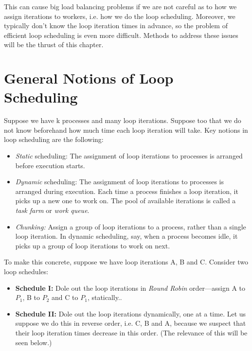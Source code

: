 This can cause big load balancing problems if we are not careful as to
how we assign iterations to workers, i.e. how we do the loop scheduling.
Moreover, we typically don't know the loop iteration times in advance, so the
problem of efficient loop scheduling is even more difficult.  Methods to
address these issues will be the thrust of this chapter.

\section{General Notions of Loop Scheduling}
\label{gensched}

Suppose we have k processes and many loop iterations.  Suppose too that
we do not know beforehand how much time each loop iteration will take.
Key notions in loop scheduling are the following:

\begin{itemize}

\item {\it Static} scheduling:  The assignment of loop iterations to
processes is arranged before execution starts.

\item {\it Dynamic} scheduling:  The assignment of loop iterations to
processes is arranged during execution.  Each time a process finishes a
loop iteration, it picks up a new one to work on.  The pool of available
iterations is called a {\it task farm} or {\it work queue}.

\item {\it Chunking:}  Assign a group of loop iterations to a process,
rather than a single loop iteration.  In dynamic scheduling, say, when a
process becomes idle, it picks up a group of loop iterations to work on
next.

\end{itemize}

To make this concrete, suppose we have loop iterations A, B and C. 
Consider two loop schedules:

\begin{itemize}
\item {\bf Schedule I:}  Dole out the loop iterations in {\it Round Robin}
order---assign A to $P_1$, B to $P_2$ and C to $P_1$, statically..  

\item {\bf Schedule II:}  Dole out the loop iterations dynamically, one
at a time.  Let us suppose we do this in reverse order, i.e. C, B and A,
because we suspect that their loop iteration times decrease in this
order.  (The relevance of this will be seen below.)

\end{itemize}

